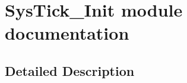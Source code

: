 \hypertarget{group___sys_tick___init__module}{}\section{Sys\+Tick\+\_\+\+Init module documentation}
\label{group___sys_tick___init__module}


\subsection{Detailed Description}
